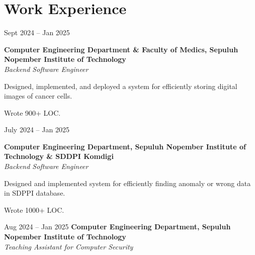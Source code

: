 \section{Work Experience}

    \begin{twocolentry}{
        Sept 2024 – Jan 2025
    }

    \textbf{Computer Engineering Department \& Faculty of Medics, Sepuluh Nopember Institute of Technology}\\
    \textit{Backend Software Engineer}
    \end{twocolentry}

    \vspace{0.10 cm}
    \begin{onecolentry}
        \begin{highlights}
            \item Designed, implemented, and deployed a system for efficiently storing digital images of cancer cells.
            \item Wrote 900+ LOC.
        \end{highlights}
    \end{onecolentry}

    \vspace{0.2 cm}

    \begin{twocolentry}{
        July 2024 – Jan 2025
    }

    \textbf{Computer Engineering Department, Sepuluh Nopember Institute of Technology \& SDDPI Komdigi}\\
    \textit{Backend Software Engineer}
    \end{twocolentry}

    \vspace{0.10 cm}
    \begin{onecolentry}
        \begin{highlights}
            \item Designed and implemented system for efficiently finding anomaly or wrong data in SDPPI database.
            \item Wrote 1000+ LOC.
        \end{highlights}
    \end{onecolentry}

    \vspace{0.2 cm}

    \begin{twocolentry}{
        Aug 2024 – Jan 2025
    }
    \textbf{Computer Engineering Department, Sepuluh Nopember Institute of Technology}\\
    \textit{Teaching Assistant for Computer Security}
    \end{twocolentry}


